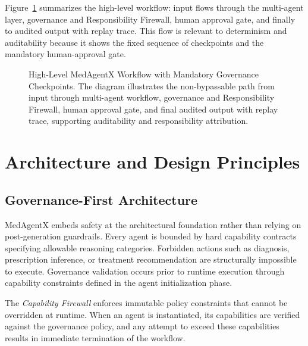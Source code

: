 \documentclass[journal]{IEEEtran}
\begin{document}
Figure~\ref{fig:workflow_high} summarizes the high-level workflow: input flows through the multi-agent layer, governance and Responsibility Firewall, human approval gate, and finally to audited output with replay trace. This flow is relevant to determinism and auditability because it shows the fixed sequence of checkpoints and the mandatory human-approval gate.
\begin{figure}[H]
\centering
{}
\caption{High-Level MedAgentX Workflow with Mandatory Governance Checkpoints. The diagram illustrates the non-bypassable path from input through multi-agent workflow, governance and Responsibility Firewall, human approval gate, and final audited output with replay trace, supporting auditability and responsibility attribution.}
\label{fig:workflow_high}
\end{figure}

\newpage
\section{Architecture and Design Principles}

\subsection{Governance-First Architecture}
MedAgentX embeds safety at the architectural foundation rather than relying on post-generation guardrails. Every agent is bounded by hard capability contracts specifying allowable reasoning categories. Forbidden actions such as diagnosis, prescription inference, or treatment recommendation are structurally impossible to execute. Governance validation occurs prior to runtime execution through capability constraints defined in the agent initialization phase.

The \textit{Capability Firewall} enforces immutable policy constraints that cannot be overridden at runtime. When an agent is instantiated, its capabilities are verified against the governance policy, and any attempt to exceed these capabilities results in immediate termination of the workflow.
\end{document}
